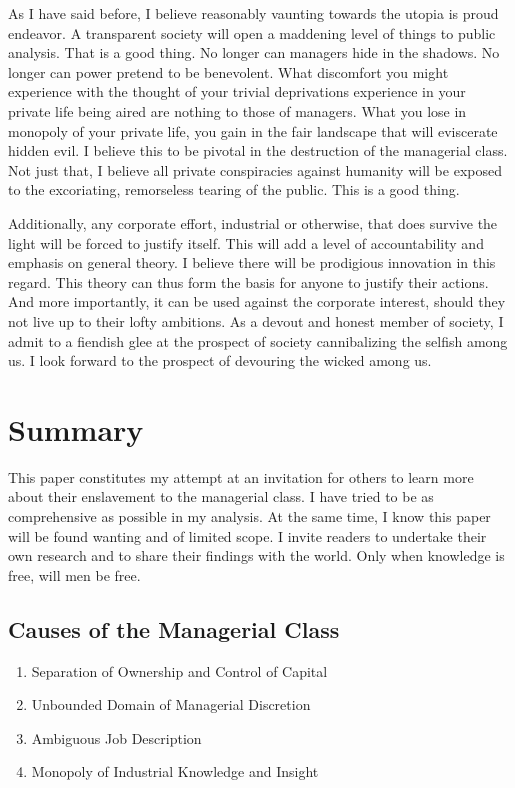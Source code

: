 \documentclass[12pt]{article}
\begin{document}
As I have said before, I believe reasonably vaunting towards the utopia is proud endeavor.
A transparent society will open a maddening level of things to public analysis.
That is a good thing.
No longer can managers hide in the shadows.
No longer can power pretend to be benevolent.
What discomfort you might experience with the thought of your trivial deprivations experience in your private life being aired are nothing to those of managers.
What you lose in monopoly of your private life, you gain in the fair landscape that will eviscerate hidden evil.
I believe this to be pivotal in the destruction of the managerial class.
Not just that, I believe all private conspiracies against humanity will be exposed to the excoriating, remorseless tearing of the public.
This is a good thing.

Additionally, any corporate effort, industrial or otherwise, that does survive the light will be forced to justify itself.
This will add a level of accountability and emphasis on general theory.
I believe there will be prodigious innovation in this regard.
This theory can thus form the basis for anyone to justify their actions.
And more importantly, it can be used against the corporate interest, should they not live up to their lofty ambitions.
As a devout and honest member of society, I admit to a fiendish glee at the prospect of society cannibalizing the selfish among us.
I look forward to the prospect of devouring the wicked among us.

\section{Summary}
This paper constitutes my attempt at an invitation for others to learn more about their enslavement to the managerial class.
I have tried to be as comprehensive as possible in my analysis.
At the same time, I know this paper will be found wanting and of limited scope.
I invite readers to undertake their own research and to share their findings with the world.
Only when knowledge is free, will men be free.

\subsection{Causes of the Managerial Class}
\begin{enumerate}
    \item Separation of Ownership and Control of Capital
    \item Unbounded Domain of Managerial Discretion
    \item Ambiguous Job Description
    \item Monopoly of Industrial Knowledge and Insight
\end{enumerate}
\end{document}

